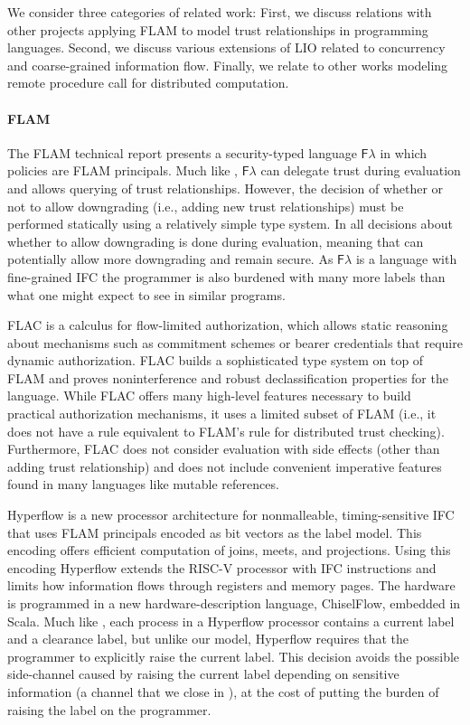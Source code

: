 We consider three categories of related work: First, we discuss relations with other projects applying FLAM to model trust relationships in programming languages. Second, we discuss various extensions of LIO related to concurrency and coarse-grained information flow. Finally, we relate \lang{} to other works modeling remote procedure call for distributed computation.

\paragraph{FLAM}
The FLAM technical report \cite{flamtr} presents a security-typed language $\mathsf{F}\lambda$ in which policies are FLAM principals. Much like \lang{}, $\mathsf{F}\lambda$ can delegate trust during evaluation and allows querying of trust relationships. However, the decision of whether or not to allow downgrading (i.e., adding new trust relationships) must be performed statically using a relatively simple type system. In \lang{} all decisions about whether to allow downgrading is done during evaluation, meaning that \lang{} can potentially allow more downgrading and remain secure. As $\mathsf{F}\lambda$ is a language with fine-grained IFC the programmer is also burdened with many more labels than what one might expect to see in similar \lang{} programs.

FLAC \cite{7536372} is a calculus for flow-limited authorization, which allows static reasoning about mechanisms such as commitment schemes or bearer credentials that require dynamic authorization. FLAC builds a sophisticated type system on top of FLAM and proves noninterference and robust declassification properties for the language. While FLAC offers many high-level features necessary to build practical authorization mechanisms, it uses a limited subset of FLAM (i.e., it does not have a rule equivalent to FLAM's  rule for distributed trust checking). Furthermore, FLAC does not consider evaluation with side effects (other than adding trust relationship) and does not include convenient imperative features found in many languages like mutable references.

Hyperflow \cite{hyperflow} is a new processor architecture for nonmalleable, timing-sensitive IFC that uses FLAM principals encoded as bit vectors as the label model. This encoding offers efficient computation of joins, meets, and projections. Using this encoding Hyperflow extends the RISC-V processor with IFC instructions and limits how information flows through registers and memory pages. The hardware is programmed in a new hardware-description language, ChiselFlow, embedded in Scala. Much like \lang{}, each process in a Hyperflow processor contains a current label and a clearance label, but unlike our model, Hyperflow requires that the programmer to explicitly raise the current label. This decision avoids the possible side-channel caused by raising the current label depending on sensitive information (a channel that we close in \lang), at the cost of putting the burden of raising the label on the programmer.

